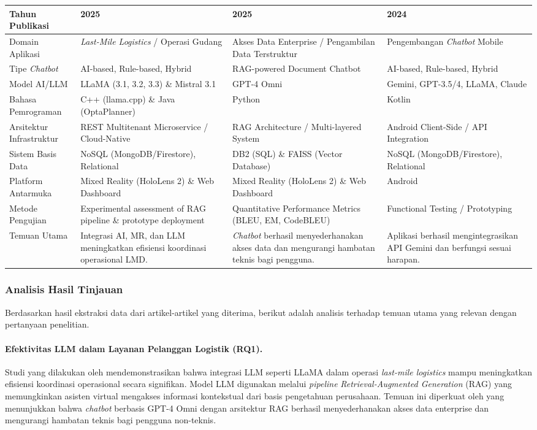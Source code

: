 \begin{longtable}{|p{3.5cm}|p{3.5cm}|p{3.5cm}|p{3.5cm}|}
Tahun Publikasi & 2025 & 2025 & 2024 \\
\hline
Domain Aplikasi & \textit{Last-Mile Logistics} / Operasi Gudang & Akses Data Enterprise / Pengambilan Data Terstruktur & Pengembangan \textit{Chatbot} Mobile \\
\hline
Tipe \textit{Chatbot} & AI-based, Rule-based, Hybrid & RAG-powered Document Chatbot & AI-based, Rule-based, Hybrid \\
\hline
Model AI/LLM & LLaMA (3.1, 3.2, 3.3) \& Mistral 3.1 & GPT-4 Omni & Gemini, GPT-3.5/4, LLaMA, Claude \\
\hline
Bahasa Pemrograman & C++ (llama.cpp) \& Java (OptaPlanner) & Python & Kotlin \\
\hline
Arsitektur Infrastruktur & REST Multitenant Microservice / Cloud-Native & RAG Architecture / Multi-layered System & Android Client-Side / API Integration \\
\hline
Sistem Basis Data & NoSQL (MongoDB/Firestore), Relational & DB2 (SQL) \& FAISS (Vector Database) & NoSQL (MongoDB/Firestore), Relational \\
\hline
Platform Antarmuka & Mixed Reality (HoloLens 2) \& Web Dashboard & Mixed Reality (HoloLens 2) \& Web Dashboard & Android \\
\hline
Metode Pengujian & Experimental assessment of RAG pipeline \& prototype deployment & Quantitative Performance Metrics (BLEU, EM, CodeBLEU) & Functional Testing / Prototyping \\
\hline
Temuan Utama & Integrasi AI, MR, dan LLM meningkatkan efisiensi koordinasi operasional LMD. & \textit{Chatbot} berhasil menyederhanakan akses data dan mengurangi hambatan teknis bagi pengguna. & Aplikasi berhasil mengintegrasikan API Gemini dan berfungsi sesuai harapan. \\
\hline
\end{longtable}

\subsubsection{Analisis Hasil Tinjauan}

Berdasarkan hasil ekstraksi data dari artikel-artikel yang diterima, berikut adalah analisis terhadap temuan utama yang relevan dengan pertanyaan penelitian.

\paragraph{Efektivitas LLM dalam Layanan Pelanggan Logistik (RQ1).}
Studi yang dilakukan oleh \textcite{garcia2025} mendemonstrasikan bahwa integrasi LLM seperti LLaMA dalam operasi \textit{last-mile logistics} mampu meningkatkan efisiensi koordinasi operasional secara signifikan. Model LLM digunakan melalui \textit{pipeline} \textit{Retrieval-Augmented Generation} (RAG) yang memungkinkan asisten virtual mengakses informasi kontekstual dari basis pengetahuan perusahaan. Temuan ini diperkuat oleh \textcite{aipowered2025} yang menunjukkan bahwa \textit{chatbot} berbasis GPT-4 Omni dengan arsitektur RAG berhasil menyederhanakan akses data enterprise dan mengurangi hambatan teknis bagi pengguna non-teknis.

